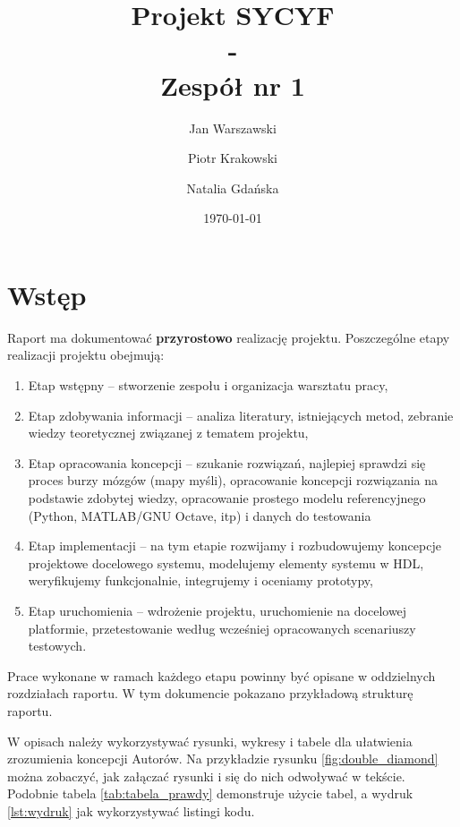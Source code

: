 \documentclass[a4paper,titleauthor]{mwart}
\title{{\Huge  Projekt SYCYF}\\ - \\{\Large Zespół nr 1}\\ }
\author{Jan Warszawski \and Piotr Krakowski \and Natalia Gdańska}
\date{\today}
\begin{document}
	
\maketitle




\tableofcontents

\section{Wstęp}
\label{sec:wstep}%

Raport ma dokumentować \textbf{przyrostowo} realizację projektu. Poszczególne etapy realizacji projektu obejmują: 

\renewcommand{\labelenumi}{\Roman{enumi}}
\begin{enumerate}\setlength{\itemsep}{0.2\baselineskip} 
	\item Etap wstępny – stworzenie zespołu i organizacja warsztatu pracy, 
	\item Etap zdobywania informacji – analiza literatury, istniejących metod, zebranie wiedzy teoretycznej związanej z tematem projektu, 
	\item Etap opracowania koncepcji – szukanie rozwiązań, najlepiej sprawdzi się proces burzy mózgów (mapy myśli), opracowanie koncepcji rozwiązania  na podstawie zdobytej wiedzy, opracowanie prostego modelu referencyjnego (Python, MATLAB/GNU Octave, itp) i danych do testowania  
	\item Etap implementacji – na tym etapie rozwijamy i rozbudowujemy koncepcje projektowe docelowego systemu, modelujemy elementy systemu w HDL, weryfikujemy funkcjonalnie, integrujemy i oceniamy prototypy, 
	\item Etap uruchomienia – wdrożenie projektu, uruchomienie na docelowej platformie, przetestowanie według wcześniej opracowanych scenariuszy testowych. 
\end{enumerate}

Prace wykonane w ramach każdego etapu powinny być opisane w oddzielnych rozdziałach raportu. W tym dokumencie pokazano przykładową strukturę raportu. 

W opisach należy wykorzystywać rysunki, wykresy i tabele dla ułatwienia zrozumienia koncepcji Autorów. Na przykładzie rysunku  \ref{fig:double_diamond}  można zobaczyć, jak załączać rysunki i się do nich odwoływać w tekście. Podobnie tabela \ref{tab:tabela_prawdy} demonstruje użycie tabel, a wydruk \ref{lst:wydruk} jak wykorzystywać listingi kodu. 
\end{document}
